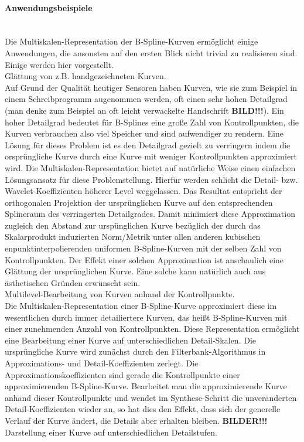 \paragraph{Anwendungsbeispiele}~\\
Die Multiskalen-Representation der B-Spline-Kurven ermöglicht einige Anwendungen, die ansonsten auf den ersten Blick nicht trivial zu realisieren sind. Einige werden hier vorgestellt.
\\
Glättung von z.B. handgezeichneten Kurven.\\
Auf Grund der Qualität heutiger Sensoren haben Kurven, wie sie zum Beispiel in einem Schreibprogramm augenommen werden, oft einen sehr hohen Detailgrad (man denke zum Beispiel an oft leicht verwackelte Handschrift \textbf{BILD!!!}). Ein hoher Detailgrad bedeutet für B-Splines eine große Zahl von Kontrollpunkten, die Kurven verbrauchen also viel Speicher und sind aufwendiger zu rendern. Eine Lösung für dieses Problem ist es den Detailgrad gezielt zu verringern indem die orsprüngliche Kurve durch eine Kurve mit weniger Kontrollpunkten approximiert wird. Die Multiskalen-Representation bietet auf natürliche Weise einen einfachen Lösungsansatz für diese Problemstellung. Hierfür werden schlicht die Detail- bzw. Wavelet-Koeffizienten höherer Level weggelassen. Das Resultat entspricht der orthogonalen Projektion der ursprünglichen Kurve auf den entsprechenden Splineraum des verringerten Detailgrades. Damit minimiert diese Approximation zugleich den Abstand zur urspünglichen Kurve bezüglich der durch das Skalarprodukt induzierten Norm/Metrik unter allen anderen kubischen enpunktinterpolierenden uniformen B-Spline-Kurven mit der selben Zahl von Kontrollpunkten.
Der Effekt einer solchen Approximation ist anschaulich eine Glättung der ursprünglichen Kurve. Eine solche kann natürlich auch aus ästhetischen Gründen erwünscht sein.
\\
Multilevel-Bearbeitung von Kurven anhand der Kontrollpunkte.\\
Die Multiskalen-Representation einer B-Spline-Kurve approximiert diese im wesentlichen durch immer detailiertere Kurven, das heißt B-Spline-Kurven mit einer zunehmenden Anzahl von Kontrollpunkten. Diese Representation ermöglicht eine Bearbeitung einer Kurve auf unterschiedlichen Detail-Skalen. Die ursprüngliche Kurve wird zunächst durch den Filterbank-Algorithmus in Approximations- und Detail-Koeffizienten zerlegt. Die Approximationskoeffizienten sind gerade die Kontrollpunkte einer approximierenden B-Spline-Kurve. Bearbeitet man die approximierende Kurve anhand dieser Kontrollpunkte und wendet im Synthese-Schritt die unveränderten Detail-Koeffizienten wieder an, so hat dies den Effekt, dass sich der generelle Verlauf der Kurve ändert, die Details aber erhalten bleiben. \textbf{BILDER!!!}
\\
Darstellung einer Kurve auf unterschiedlichen Detailstufen.
%
%